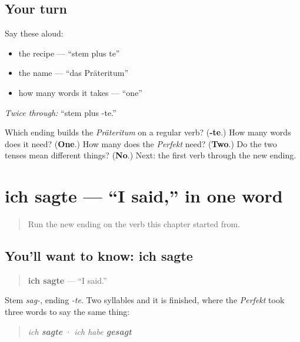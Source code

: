 \subsection*{Your turn}
Say these aloud:

\begin{itemize}
\raggedright
  \item the recipe — \textquotedblleft{}stem plus te\textquotedblright{}
  \item the name — \textquotedblleft{}das Präteritum\textquotedblright{}
  \item how many words it takes — \textquotedblleft{}one\textquotedblright{}
\end{itemize}

\emph{Twice through:} \textquotedblleft{}stem plus -te.\textquotedblright{}

\begin{tcolorbox}[breakable,colback=teal!4,colframe=teal!35!black,title={Before you move on}]
Which ending builds the \emph{Präteritum} on a regular verb? (\textbf{-te}.) How many words does it need? (\textbf{One}.) How many does the \emph{Perfekt} need? (\textbf{Two}.) Do the two tenses mean different things? (\textbf{No}.) Next: the first verb through the new ending.
\end{tcolorbox}
\section[ich sagte]{ich sagte — \textquotedblleft{}I said,\textquotedblright{} in one word}

\label{lesson:GE-C15-sagte}



\begin{quote}
Run the new ending on the verb this chapter started from.
\end{quote}

\subsection*{You'll want to know: ich sagte}
\begin{quote}
\textbf{ich sagte} — \textquotedblleft{}I said.\textquotedblright{}
\end{quote}

Stem \emph{sag-}, ending \emph{-te}. Two syllables and it is finished, where the \emph{Perfekt} took three words to say the same thing:

\begin{quote}
\emph{ich \textbf{sagte}} · \emph{ich habe \textbf{gesagt}}
\end{quote}

